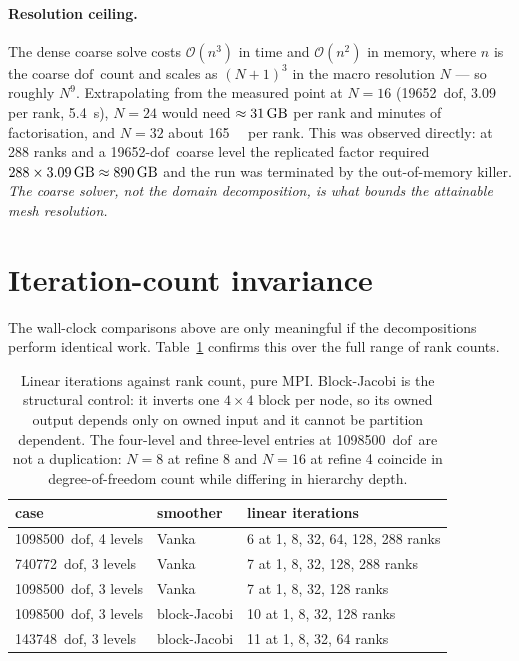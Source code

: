 \documentclass[11pt,a4paper]{article}
\newcommand{\dofs}{\ensuremath{\mathrm{dof}}}
\begin{document}
\paragraph{Resolution ceiling.} The dense coarse solve costs
\(\mathcal{O}(n^3)\) in time and \(\mathcal{O}(n^2)\) in memory, where \(n\) is
the coarse \dofs\ count and scales as \((N+1)^3\) in the macro resolution \(N\)
--- so roughly \(N^9\). Extrapolating from the measured point at \(N=16\)
(\num{19652}~\dofs, \SI{3.09}{\giga\byte} per rank, \SI{5.4}{\second}), \(N=24\)
would need \(\approx\SI{31}{\giga\byte}\) per rank and minutes of factorisation,
and \(N=32\) about \SI{165}{\giga\byte} per rank. This was observed directly: at
\num{288} ranks and a \num{19652}-\dofs\ coarse level the replicated factor
required \(288\times\SI{3.09}{\giga\byte}\approx\SI{890}{\giga\byte}\) and the run
was terminated by the out-of-memory killer. \emph{The coarse solver, not the
domain decomposition, is what bounds the attainable mesh resolution.}

\section{Iteration-count invariance}

The wall-clock comparisons above are only meaningful if the decompositions
perform identical work. Table~\ref{tab:invariance} confirms this over the full
range of rank counts.

\begin{table}[htbp]
\centering
\caption{Linear iterations against rank count, pure MPI. Block-Jacobi is the
structural control: it inverts one \(4\times4\) block per node, so its owned
output depends only on owned input and it cannot be partition dependent. The
four-level and three-level entries at \num{1098500}~\dofs\ are not a
duplication: \(N=8\) at refine \num{8} and \(N=16\) at refine \num{4} coincide in
degree-of-freedom count while differing in hierarchy depth.}
\label{tab:invariance}
\begin{tabular}{lll}
\toprule
case & smoother & linear iterations \\
\midrule
\num{1098500}~\dofs, 4 levels & Vanka        & \num{6} at 1, 8, 32, 64, 128, 288 ranks \\
\num{740772}~\dofs, 3 levels  & Vanka        & \num{7} at 1, 8, 32, 128, 288 ranks \\
\num{1098500}~\dofs, 3 levels & Vanka        & \num{7} at 1, 8, 32, 128 ranks \\
\num{1098500}~\dofs, 3 levels & block-Jacobi & \num{10} at 1, 8, 32, 128 ranks \\
\num{143748}~\dofs, 3 levels  & block-Jacobi & \num{11} at 1, 8, 32, 64 ranks \\
\bottomrule
\end{tabular}
\end{table}
\end{document}
